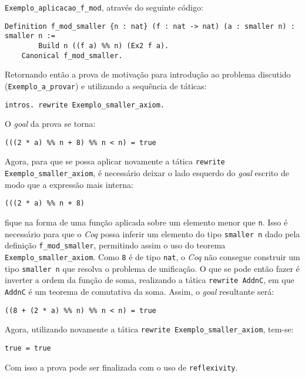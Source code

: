  \lstinline[language = coq]!Exemplo_aplicacao_f_mod!, através do seguinte código:
\begin{lstlisting}[language = coq]
    Definition f_mod_smaller {n : nat} (f : nat -> nat) (a : smaller n) : smaller n := 
        Build n ((f a) %% n) (Ex2 f a).
    Canonical f_mod_smaller.
\end{lstlisting} 
    Retornando então a prova de motivação para introdução ao problema discutido\\
    (\lstinline[language = coq]!Exemplo_a_provar!) e utilizando a sequência de táticas:
\begin{lstlisting}[language = coq]
    intros. rewrite Exemplo_smaller_axiom.
\end{lstlisting} 
O \textit{goal} da prova se torna:
\begin{lstlisting}[language = coq]
    (((2 * a) %% n + 8) %% n < n) = true
\end{lstlisting}
Agora, para que se possa aplicar novamente a tática \lstinline[language = coq]!rewrite Exemplo_smaller_axiom!, é necessário deixar o lado esquerdo do \textit{goal} escrito de modo que a expressão mais interna:
\begin{lstlisting}[language = coq]
    (((2 * a) %% n + 8)
\end{lstlisting}
fique na forma de uma função aplicada sobre um elemento menor que \lstinline[language = coq]!n!.
Isso é necessário para que o \textit{Coq} possa inferir um elemento do tipo \lstinline[language = coq]!smaller n! dado pela definição \lstinline[language = coq]!f_mod_smaller!, permitindo assim o uso do teorema  \lstinline[language = coq]!Exemplo_smaller_axiom!. Como \lstinline[language = coq]!8! é de tipo \lstinline[language = coq]!nat!, o \textit{Coq} não consegue construir um tipo \lstinline[language = coq]!smaller n! que resolva
o problema de unificação. O que se pode então fazer é inverter a ordem da função de soma, realizando a tática \lstinline[language = coq]!rewrite AddnC!, em que \lstinline[language = coq]!AddnC! é um teorema de comutativa da soma. Assim, o \textit{goal} resultante será:
\begin{lstlisting}[language = coq]
    ((8 + (2 * a) %% n) %% n < n) = true
\end{lstlisting}
Agora, utilizando novamente a tática \lstinline[language = coq]!rewrite Exemplo_smaller_axiom!, tem-se:
\begin{lstlisting}[language = coq]
    true = true
\end{lstlisting}
Com isso a prova pode ser finalizada com o uso de 
\lstinline[language = coq]!reflexivity!.